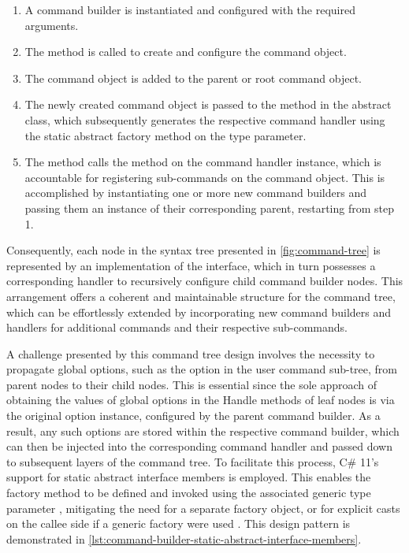 \begin{enumerate}
    \item A command builder is instantiated and configured with the required arguments.
    \item The  method is called to create and configure the  command object.
    \item The command object is added to the parent or root command object.
    \item The newly created command object is passed to the  method in the abstract  class, which subsequently generates the respective command handler using the static abstract  factory method on the  type parameter.
    \item The  method calls the  method on the command handler instance, which is accountable for registering sub-commands on the  command object. This is accomplished by instantiating one or more new command builders and passing them an instance of their corresponding parent, restarting from step 1.
\end{enumerate}

Consequently, each node in the syntax tree presented in \cref{fig:command-tree} is represented by an implementation of the  interface, which in turn possesses a corresponding handler to recursively configure child command builder nodes. This arrangement offers a coherent and maintainable structure for the command tree, which can be effortlessly extended by incorporating new command builders and handlers for additional commands and their respective sub-commands.

A challenge presented by this command tree design involves the necessity to propagate global options, such as the  option in the user command sub-tree, from parent nodes to their child nodes. This is essential since the sole approach of obtaining the values of global options in the Handle methods of leaf nodes is via the original  option instance, configured by the parent command builder. As a result, any such options are stored within the respective command builder, which can then be injected into the corresponding command handler and passed down to subsequent layers of the command tree. To facilitate this process, C\# 11's support for static abstract interface members is employed. This enables the  factory method to be defined and invoked using the associated generic type parameter , mitigating the need for a separate factory object, or for explicit casts on the callee side if a generic factory were used \cite{ecma335cli-augments}. This design pattern is demonstrated in \cref{lst:command-builder-static-abstract-interface-members}.

